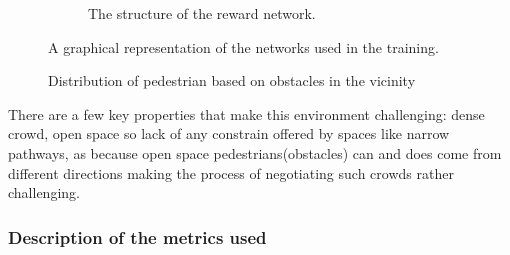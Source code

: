 \begin{figure}
\begin{subfigure}[b]{.5\textwidth}
    	\caption{The structure of the reward network.}
    	\label{fig:reward-network}
    \end{subfigure}%
\caption{A graphical representation of the networks used in the training.}
\end{figure}
\begin{figure}
    \caption {Distribution of pedestrian based on obstacles in the vicinity}
\end{figure}
There are a few key properties that make this environment challenging: dense crowd, open space so lack of any constrain offered by spaces like narrow pathways, as because open space pedestrians(obstacles) can and does come from different directions making the process of negotiating such crowds rather challenging. 

%            

\subsubsection*{Description of the metrics used}
%

